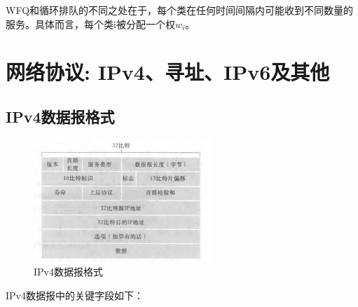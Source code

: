     WFQ和循环排队的不同之处在于，每个类在任何时间间隔内可能收到不同数量的服务。具体而言，每个类i被分配一个权$w_{i}$。

\section{网络协议: IPv4、寻址、IPv6及其他}

\subsection{IPv4数据报格式}

\begin{figure}[!htbp]
    \centering
    \includegraphics[width=0.6\textwidth]{image/chapter04/IPv4数据包格式.png}
    \caption{IPv4数据报格式}
\end{figure}

    IPv4数据报中的关键字段如下：

